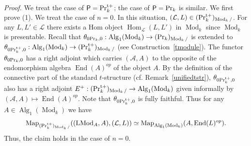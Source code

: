 \documentclass[leqno,12pt]{amsart}
\theoremstyle{plain}
\theoremstyle{definition}
\newcommand{\PR}{\textup{Pr}}
\newcommand{\PRTT}{\textup{Pr}^{\textup{t}+}}
\newcommand{\LLL}{\mathcal{L}}
\newcommand{\Hom}{\operatorname{Hom}}
\newcommand{\Mod}{\operatorname{Mod}}
\newcommand{\Map}{\operatorname{Map}}
\newcommand{\Alg}{\operatorname{Alg}}
\newcommand{\End}{\operatorname{End}}
\newcommand{\LMod}{\operatorname{LMod}}
\newcommand{\Proof}{{\sl Proof.}\quad}
\begin{document}
\Proof
We treat the case of $\mathsf{P}=\PRTT_k$; the case of $\mathsf{P}=\PR_k$ is similar. 
We first prove (1).
We treat the case of $n=0$.
In this situation, $(\LLL,L)\in (\PRTT_k)_{\Mod_k/}$.
For any $L,L'\in \LLL$ there exists a Hom object $\Hom_{\LLL}(L,L')$ in $\Mod_k$
since $\Mod_k$ is presentable.
Recall that $\theta_{0\PR_k,0}:\Alg_1(\Mod_k)\to (\PR_k)_{\Mod_k/}$ is extended to
$\theta_{0\PRTT_k,0}:\Alg_1(\Mod_k)\to (\PRTT_k)_{\Mod_k/}$ (see Construction~\ref{tmodule}).
The functor $\theta_{0\PR_k,0}$ has a right adjoint which carries $(\mathcal{A},A)$
to the opposite of the endomorphism algebra $\End(A)^{op}$ of the object $A$.
By the definition of the connective part of the standard $t$-structure (cf. Remark~\ref{unifiedtstr}),
$\theta_{0\PRTT_k,0}$ also has a right adjoint $E^+:(\PRTT_k)_{\Mod_k/}\to \Alg_1(\Mod_k)$
given informally by $(\mathcal{A},A)\mapsto \End(A)^{op}$.
Note that $\theta_{0\PRTT_k,0}$ is fully faithful.
Thus for any $A\in \Alg_1(\Mod_k)$ we have
\[
 \Map_{(\PRTT_k)_{\Mod_k/}}((\LMod_A,A),(\LLL,L))\simeq \Map_{\Alg_1(\Mod_k)}(A,\End(L)^{op}).
\]
Thus, the claim holds in the case of $n=0$.
\end{document}
